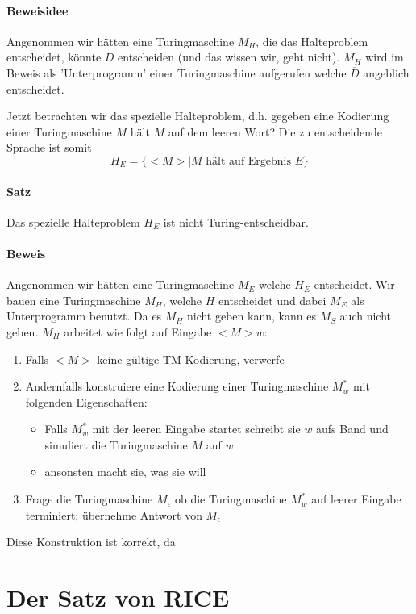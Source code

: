 \paragraph*{Beweisidee} Angenommen wir hätten eine Turingmaschine $M_H$, die das Halteproblem entscheidet, könnte $\overline{D}$ entscheiden (und das wissen wir, geht nicht). $M_H$ wird im Beweis als 'Unterprogramm' einer Turingmaschine aufgerufen welche $\overline{D}$ angeblich entscheidet.

\para{} Jetzt betrachten wir das spezielle Halteproblem, d.h. gegeben eine Kodierung einer Turingmaschine $M$ %
hält $M$ auf dem leeren Wort? Die zu entscheidende Sprache ist somit $$ H_E = \{ <M> | M \text{ hält auf Ergebnis }  E \} $$

\paragraph*{Satz} Das spezielle Halteproblem $H_E$ ist nicht Turing-entscheidbar.

\paragraph*{Beweis} Angenommen wir hätten eine Turingmaschine $M_E$ welche $H_E$ entscheidet. Wir bauen eine Turingmaschine $M_H$, welche $H$ entscheidet und dabei $M_E$ als Unterprogramm benutzt. Da es $M_H$ nicht geben kann, kann es $M_S$ auch nicht geben. $M_H$ arbeitet wie folgt auf Eingabe $<M>w$:
\begin{enumerate}
	\item Falls $<M>$ keine gültige TM-Kodierung, verwerfe
	\item Andernfalls konstruiere eine Kodierung einer Turingmaschine $M_w^*$ mit folgenden Eigenschaften:
	\begin{itemize}
		\item Falls $M_w^*$ mit der leeren Eingabe startet schreibt sie $w$ aufs Band und simuliert die Turingmaschine $M$ auf $w$
		\item ansonsten macht sie, was sie will
	\end{itemize}
	\item Frage die Turingmaschine $M_\epsilon$ ob die Turingmaschine $M_w^*$ auf leerer Eingabe terminiert; übernehme Antwort von $M_\epsilon$
\end{enumerate}

\para{} Diese Konstruktion ist korrekt, da


\section{Der Satz von RICE}


